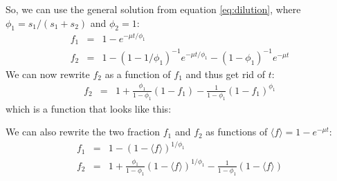\documentclass{article}
\newcommand{\fin}{\ensuremath{\langle f \rangle}}
\begin{document}
So, we can use the general solution from equation \ref{eq:dilution}, where $\phi_1 = s_1 / (s_1 + s_2)$ and $\phi_2 = 1$:
\begin{eqnarray}
    f_1 &=& 1 - e^{- \mu t / \phi_1} \\
    f_2 &=& 1 - \left(1 - 1 / \phi_1 \right)^{-1} e^{- \mu t / \phi_1} - \left(1 - \phi_1 \right)^{-1} e^{- \mu t}
\end{eqnarray}
We can now rewrite $f_2$ as a function of $f_1$ and thus get rid of $t$:
\begin{eqnarray}
    f_2 &=& 1 + \frac{\phi_1}{1-\phi_1} (1 - f_1) - \frac{1}{1-\phi_1} (1 - f_1)^{\phi_1}
\end{eqnarray}
which is a function that looks like this:
\begin{center}
\end{center}

We can also rewrite the two fraction $f_1$ and $f_2$ as functions of $\fin = 1 - e^{- \mu t}$:
\begin{eqnarray}
    f_1 &=& 1 - (1 - \fin)^{1/{\phi_1}} \label{eq:two_step_f1_vs_ftot} \nonumber\\
    f_2 &=& 1 + \frac{\phi_1}{1-\phi_1} (1 - \fin)^{1/{\phi_1}} - \frac{1}{1-\phi_1} (1 - \fin) \label{eq:two_step_f2_vs_ftot}
\end{eqnarray}
\end{document}
